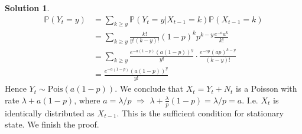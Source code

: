 \documentclass[a4paper, 10pt]{article}
\theoremstyle{definition}
\theoremstyle{hSol}
\newtheorem*{solution}{Solution}
\begin{document}
\begin{solution}
\begin{equation}
  \begin{split}
    \mathbb{P}\left(Y_t = y\right) &= \sum_{k\geq y}\mathbb{P}\left(Y_t=y|X_{t-1}=k\right)\mathbb{P}\left(X_{t-1}=k\right)\\
    &= \sum_{k\geq y} \frac{k!}{y!(k-y)!}(1-p)^kp^{k-y}\frac{e^{-a}a^k}{k!}\\
    &= \sum_{k\geq y} \frac{e^{-a(1-p)}(a(1-p))^y}{y!}\cdot\frac{e^{-ap}(ap)^{k-y}}{(k-y)!}\\
    &= \frac{e^{-a(1-p)}(a(1-p))^y}{y!}
  \end{split}
\end{equation}
Hence $Y_t\sim\text{Pois}(a(1-p))$. We conclude that $X_t=Y_t+N_t$ is a Poisson with rate $\lambda + a(1-p)$, where $a=\lambda/p$ $\Rightarrow$ $\lambda + \frac{\lambda}{p}(1-p)=\lambda/p=a$. I.e. $X_t$ is identically distributed as $X_{t-1}$. This is the sufficient condition for stationary state. We finish the proof. 
\end{solution}
\end{document}
